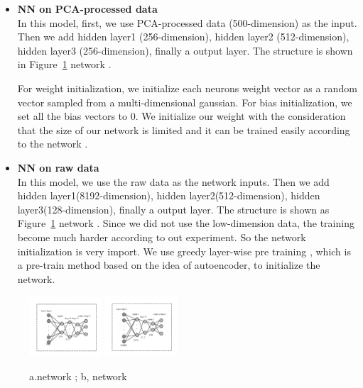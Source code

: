 \documentclass[sigconf]{acmart}
\begin{document}
\begin{itemize}
	\item \textbf{NN on PCA-processed data}\\
	In this model, first, we use PCA-processed data (500-dimension) as the input. Then we add hidden layer1 (256-dimension), hidden layer2 (512-dimension), hidden layer3 (256-dimension), finally a output layer. The structure is shown in Figure~\ref{nn_1} network . 
	
	For weight initialization, we initialize each neurons weight vector as a random vector sampled from a multi-dimensional gaussian. For bias initialization, we set all the bias vectors to $0$. We initialize our weight with the consideration that the size of our network is limited and it can be trained easily according to the network .
	
	\item \textbf{NN on raw data}\\
	In this model, we use the raw data as the network inputs. Then we add hidden layer1(8192-dimension), hidden layer2(512-dimension), hidden layer3(128-dimension), finally a output layer.  The structure is shown as Figure~\ref{nn_1} network . Since we did not use the low-dimension data, the training become much harder according to out experiment. So the network initialization is very import. We use greedy layer-wise pre training , which is a pre-train method based on the idea of autoencoder, to initialize the network. 
\end{itemize}

\begin{figure}[!ht]
	\centering
	\includegraphics[width=0.24\textwidth]{../figs/nn_pca.pdf}
	\includegraphics[width=0.24\textwidth]{../figs/nn_raw.pdf}
	\caption{a.network ;  b, network }
	\label{nn_1}
	\centering
\end{figure}
\end{document}
